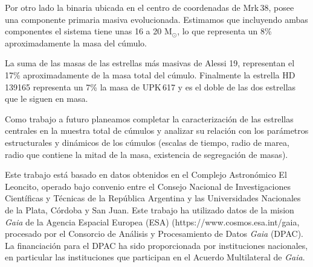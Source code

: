 \documentclass[baaa]{baaa}
\begin{document}
Por otro lado la binaria ubicada en el centro de coordenadas de Mrk\,38, posee una componente primaria masiva evolucionada. Estimamos que incluyendo ambas componentes el sistema tiene unas 16 a 20 $\mathrm{M_\odot}$, lo que representa un 8\% aproximadamente la masa del cúmulo.

La suma de las masas de las estrellas más masivas de Alessi 19, representan el 17\% aproximadamente de la masa total del cúmulo. Finalmente la estrella HD\,139165 representa un 7\% la masa de UPK\,617 y es el doble de las dos estrellas que le siguen en masa.

Como trabajo a futuro planeamos completar la caracterización de las estrellas centrales en la muestra total de cúmulos y analizar su relación con los parámetros estructurales y dinámicos de los cúmulos (escalas de tiempo, radio de marea, radio que contiene la mitad de la masa, existencia de segregación de masas). 


\begin{acknowledgement}
Este trabajo está basado en datos obtenidos en el Complejo Astronómico El Leoncito, operado bajo convenio entre el Consejo Nacional de Investigaciones Científicas y Técnicas de la República Argentina y las Universidades Nacionales de la Plata, Córdoba y San Juan. 
Este trabajo ha utilizado datos de la mision {\sl Gaia} de la Agencia Espacial Europea (ESA) (https://www.cosmos.esa.int/gaia, procesado por el Consorcio de Análisis y Procesamiento de Datos {\sl Gaia} (DPAC). La financiación para el DPAC ha sido proporcionada por instituciones nacionales, en particular las instituciones que participan en el Acuerdo Multilateral de {\sl Gaia}.


\end{acknowledgement}



\small

 
\end{document}
